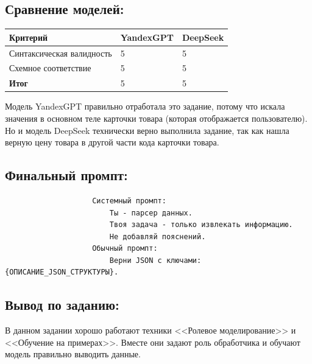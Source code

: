 \subsection{Сравнение моделей:}
\begin{table}[h!]
	\centering
	\begin{tabular}{|l|p{5cm}|p{5cm}|}
		\hline
		\textbf{Критерий} & \textbf{YandexGPT} & \textbf{DeepSeek} \\
		\hline
		Синтаксическая валидность & 5 & 5 \\
		\hline
		Схемное  соответствие & 5 & 5 \\
		\hline
		\textbf{Итог} & 5 & 5 \\
		\hline
	\end{tabular}
\end{table}
Модель YandexGPT правильно отработала это задание, потому что искала значения в основном теле карточки товара (которая отображается пользователю). Но и модель DeepSeek технически верно выполнила задание, так как нашла верную цену товара в другой части кода карточки товара.
\newpage
\subsection{Финальный промпт:}
\begin{verbatim}
					Системный промпт:
						Ты - парсер данных.
						Твоя задача - только извлекать информацию.
						Не добавляй пояснений.
					Обычный промпт:
						Верни JSON с ключами: {ОПИСАНИЕ_JSON_СТРУКТУРЫ}.
\end{verbatim}
\subsection{Вывод по заданию:}
\indent В данном задании хорошо работают техники <<Ролевое моделирование>> и <<Обучение  на  примерах>>. Вместе они задают роль обработчика и обучают модель правильно выводить данные.
